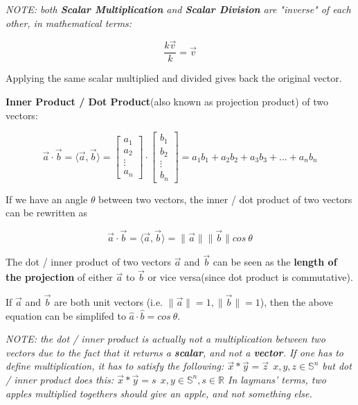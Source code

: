 \vspace{.5em}

\emph{
    NOTE: both \textbf{Scalar Multiplication} and \textbf{Scalar Division} are "inverse" of each other, in mathematical terms:
}
\begin{center}
    \[
        \frac{k\vec{v}}{k}=\vec{v}
    \]
\end{center}

Applying the same scalar multiplied and divided gives back the original vector.



\sgap

\textbf{Inner Product / Dot Product}(also known as projection product) of two vectors:
\begin{center}
    \[
        {\vec{a}} \cdot {\vec{b}}=\langle \vec{a}, \vec{b} \rangle=\begin{bmatrix}a_1 \\ a_2 \\ \vdots \\ a_n\end{bmatrix} \cdot \begin{bmatrix}b_1 \\ b_2 \\ \vdots \\ b_n\end{bmatrix}=a_1b_1+a_2b_2+a_3b_3+...+a_nb_n
    \]
\end{center}

If we have an angle $\theta$ between two vectors, the inner / dot product of two vectors can be rewritten as
\begin{center}
    \[
        {\vec{a}} \cdot {\vec{b}}=\langle \vec{a}, \vec{b} \rangle=\|\vec{a}\|\|\vec{b}\|cos~\theta
    \]
\end{center}

The dot / inner product of two vectors $\vec{a}$ and $\vec{b}$ can be seen as the \textbf{length of the projection} of either $\vec{a}$ to $\vec{b}$ or vice versa(since dot product is commutative).

If $\vec{a}$ and $\vec{b}$ are both unit vectors (i.e. $\|\vec{a}\| = 1, \|\vec{b}\| = 1$), then the above equation
can be simplifed to $\hat{a} \cdot \hat{b}=cos~\theta$.

\vspace{.5em}

\emph{
    NOTE: the dot / inner product is actually not a multiplication between two vectors due to the fact that
    it returns a \textbf{scalar}, and not a \textbf{vector}. If one has to define multiplication, it has to satisfy the following:
    $\vec{x} * \vec{y} = \vec{z} ~~ x,y,z \in \mathbb{S}^n$
    but dot / inner product does this:
    $\vec{x} * \vec{y} = s ~~ x,y \in \mathbb{S}^n, s \in \mathbb{R}$
    In laymans' terms, two apples multiplied togethers should give an apple, and not something else.
}

